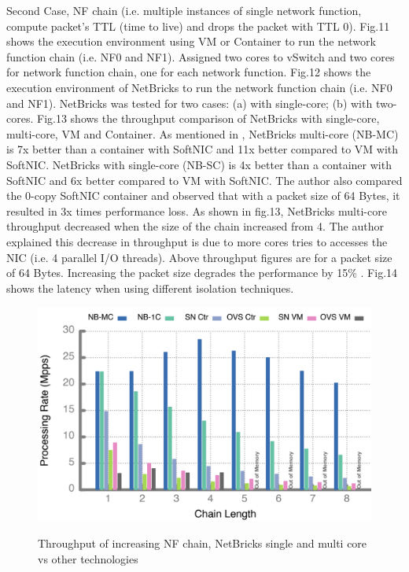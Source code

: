 \documentclass[10pt, a4paper, conference]{IEEEtran}
\begin{document}
Second Case, NF chain (i.e. multiple instances of single network function, compute packet’s TTL (time to live) and drops the packet with TTL 0). Fig.11 shows the execution environment using VM or Container to run the network function chain (i.e. NF0 and NF1). Assigned two cores to vSwitch and two cores for network function chain, one for each network function. Fig.12 shows the execution environment of NetBricks to run the network function chain (i.e. NF0 and NF1). NetBricks was tested for two cases: (a) with single-core; (b) with two-cores. Fig.13 shows the throughput comparison of NetBricks with single-core, multi-core, VM and Container. As mentioned in \cite{Panda2016}, NetBricks multi-core (NB-MC) is 7x better than a container with SoftNIC and 11x better compared to VM with SoftNIC. NetBricks with single-core (NB-SC) is 4x better than a container with SoftNIC and 6x better compared to VM with SoftNIC. The author also compared the 0-copy SoftNIC container and observed that with a packet size of 64 Bytes, it resulted in 3x times performance loss. As shown in fig.13, NetBricks multi-core throughput decreased when the size of the chain increased from 4. The author explained this decrease in throughput is due to more cores tries to accesses the NIC (i.e. 4 parallel I/O threads). Above throughput figures are for a packet size of 64 Bytes. Increasing the packet size degrades the performance by 15\% \cite{Panda2016}. Fig.14 shows the latency when using different isolation techniques.
\begin{figure}
	\centering
	\includegraphics[width=\linewidth]{figures/fig11}
	\caption{Throughput of increasing NF chain, NetBricks single and multi core vs other technologies}
	\cite{Panda2016}
	\label{key13}
\end{figure}
\end{document}
